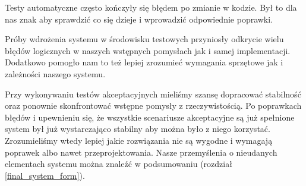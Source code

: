 \documentclass[../analiza-rozwiazania.tex]{subfiles}
\begin{document}
Testy automatyczne często kończyły się błędem po zmianie w kodzie.
Był to dla nas znak aby sprawdzić co się dzieje i wprowadzić odpowiednie poprawki.

Próby wdrożenia systemu w środowisku testowych przyniosły odkrycie wielu błędów logicznych w naszych wstępnych pomysłach jak i samej implementacji.
Dodatkowo pomogło nam to też lepiej zrozumieć wymagania sprzętowe jak i zależności naszego systemu.

Przy wykonywaniu testów akceptacyjnych mieliśmy szansę dopracować stabilność oraz ponownie skonfrontować wstępne pomysły z rzeczywistością.
Po poprawkach błędów i upewnieniu się, że wszystkie scenariusze akceptacyjne są już spełnione system był już wystarczająco stabilny aby można było z niego korzystać.
Zrozumieliśmy wtedy lepiej jakie rozwiązania nie są wygodne i wymagają poprawek albo nawet przeprojektowania.
Nasze przemyślenia o nieudanych elementach systemu można znaleźć w podsumowaniu (rozdział \ref{final_system_form}).
\end{document}
